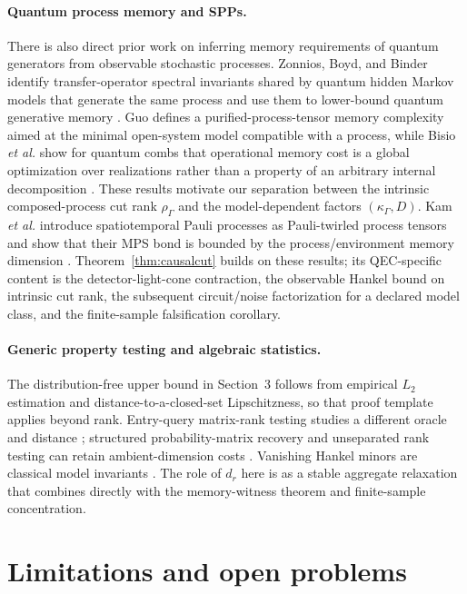 \documentclass[11pt]{article}
\begin{document}
\paragraph{Quantum process memory and SPPs.}
There is also direct prior work on inferring memory requirements of quantum generators from observable stochastic processes. Zonnios, Boyd, and Binder identify transfer-operator spectral invariants shared by quantum hidden Markov models that generate the same process and use them to lower-bound quantum generative memory \cite{zonnios2024memory}. Guo defines a purified-process-tensor memory complexity aimed at the minimal open-system model compatible with a process, while Bisio \emph{et al.} show for quantum combs that operational memory cost is a global optimization over realizations rather than a property of an arbitrary internal decomposition \cite{guo2022memory,bisio2011memory}. These results motivate our separation between the intrinsic composed-process cut rank $\rho_\Gamma$ and the model-dependent factors $(\kappa_\Gamma,D)$. Kam \emph{et al.} introduce spatiotemporal Pauli processes as Pauli-twirled process tensors and show that their MPS bond is bounded by the process/environment memory dimension \cite{kam2026spp}. Theorem~\ref{thm:causalcut} builds on these results; its QEC-specific content is the detector-light-cone contraction, the observable Hankel bound on intrinsic cut rank, the subsequent circuit/noise factorization for a declared model class, and the finite-sample falsification corollary.

\paragraph{Generic property testing and algebraic statistics.}
The distribution-free upper bound in Section~3 follows from empirical $L_2$ estimation and distance-to-a-closed-set Lipschitzness, so that proof template applies beyond rank. Entry-query matrix-rank testing studies a different oracle and distance \cite{balcan2019rank}; structured probability-matrix recovery and unseparated rank testing can retain ambient-dimension costs \cite{huang2018structured}. Vanishing Hankel minors are classical model invariants \cite{schoenhuth2009equations,critch2012binary}. The role of $d_r$ here is as a stable aggregate relaxation that combines directly with the memory-witness theorem and finite-sample concentration.

\section{Limitations and open problems}
\end{document}
